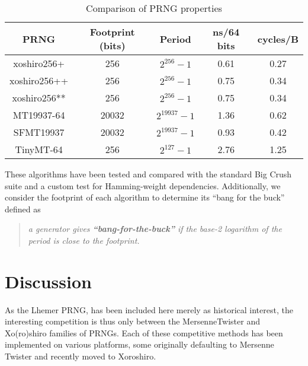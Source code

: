 \documentclass{article}
\begin{document}
        \begin{table}[h]
        \begin{center}
        \begin{tabular}{c|c|c|c|c}
            PRNG         & Footprint (bits) & Period          & ns/64 bits & cycles/B \\
            \hline
            xoshiro256+  & 256              & $2^{256} - 1$   & 0.61       & 0.27 \\
            \hline
            xoshiro256++ & 256              & $2^{256} - 1$   & 0.75       & 0.34 \\
            \hline
            xoshiro256** & 256              & $2^{256} - 1$   & 0.75       & 0.34 \\
            \hline
            MT19937-64   & 20032            & $2^{19937} - 1$ & 1.36       & 0.62 \\
            \hline
            SFMT19937    & 20032            & $2^{19937} - 1$ & 0.93       & 0.42 \\
            \hline
            TinyMT-64    & 256              & $2^{127} - 1$   & 2.76       & 1.25
        \end{tabular}
        \end{center}
            \caption{\label{tbl:comparisons}Comparison of PRNG properties}
        \end{table}

        These algorithms have been tested and compared with the standard Big Crush suite\cite{TestU01} and a custom test for Hamming-weight dependencies\cite{HammingWeightDependencies}.  Additionally, we consider the footprint of each algorithm to determine its ``bang for the buck'' defined as\cite{Shootout}
        \begin{quote}
            \textit{a generator gives \textbf{``bang-for-the-buck''} if the base-2 logarithm of the period is close to the footprint.}
        \end{quote}

    \section*{Discussion}

        As the Lhemer PRNG, has been included here merely as historical interest, the interesting competition is thus only between the MersenneTwister and Xo(ro)shiro families of PRNGs.  Each of these competitive methods has been implemented on various platforms, some originally defaulting to Mersenne Twister and recently moved to Xoroshiro.
\end{document}
